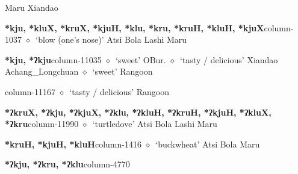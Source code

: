          Maru 
\hspace{1ex}
         Xiandao 
  \item {\footnotesize \textbf{*kju, *kluX, *kruX, *kjuH, *klu, *kru, *kruH, *kluH, *kjuX}}{\tiny column-1037}
         $\diamond$~`blow (one's nose)'
         Atsi 
\hspace{1ex}
         Bola 
\hspace{1ex}
         Lashi 
\hspace{1ex}
         Maru 
  \item {\footnotesize \textbf{*kju, *ʔkju}}{\tiny column-11035}
         $\diamond$~`sweet'
         OBur. 
\hspace{1ex}
         $\diamond$~`tasty / delicious'
         Xiandao 
\hspace{1ex}
         Achang\_Longchuan 
\hspace{1ex}
         $\diamond$~`sweet'
         Rangoon 
  \item {\footnotesize \textbf{}}{\tiny column-11167}
         $\diamond$~`tasty / delicious'
         Rangoon 
  \item {\footnotesize \textbf{*ʔkruX, *ʔkju, *ʔkjuX, *ʔklu, *ʔkluH, *ʔkruH, *ʔkjuH, *ʔkluX, *ʔkru}}{\tiny column-11990}
         $\diamond$~`turtledove'
         Atsi 
\hspace{1ex}
         Bola 
\hspace{1ex}
         Lashi 
\hspace{1ex}
         Maru 
  \item {\footnotesize \textbf{*kruH, *kjuH, *kluH}}{\tiny column-1416}
         $\diamond$~`buckwheat'
         Atsi 
\hspace{1ex}
         Bola 
\hspace{1ex}
         Maru 
  \item {\footnotesize \textbf{*ʔkju, *ʔkru, *ʔklu}}{\tiny column-4770}
